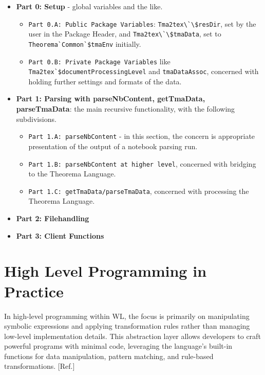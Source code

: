 \begin{itemize}
    \item \textbf{Part 0: Setup} - global variables and the like.
    \begin{itemize}
        \item \texttt{Part 0.A: Public Package Variables}: \lstinline+Tma2tex\`\$resDir+, set by the user in the Package Header, and \lstinline+Tma2tex\`\$tmaData+, set to \lstinline+Theorema`Common`$tmaEnv+ initially.
        \item \texttt{Part 0.B: Private Package Variables} like \lstinline+Tma2tex`$documentProcessingLevel+ and \lstinline+tmaDataAssoc+, concerned with holding further settings and formats of the data.
    \end{itemize}
    
    \item \textbf{Part 1: Parsing with parseNbContent, getTmaData, parseTmaData}: the main recursive functionality, with the following subdivisions.   
    \begin{itemize}
        \item \texttt{Part 1.A: parseNbContent} - in this section, the concern is appropriate presentation of the output of a notebook parsing run. 
        \item \texttt{Part 1.B: parseNbContent at higher level}, concerned with bridging to the Theorema Language.
        \item \texttt{Part 1.C: getTmaData/parseTmaData}, concerned with processing the Theorema Language.
    \end{itemize}
    
    \item \textbf{Part 2: Filehandling}
    \begin{itemize}
        
    \end{itemize}

    \item \textbf{Part 3: Client Functions}
    \begin{itemize}
        
    \end{itemize}
\end{itemize}

\section{High Level Programming in Practice}

In high-level programming within WL, the focus is primarily on manipulating symbolic expressions and applying transformation rules rather than managing low-level implementation details. This abstraction layer allows developers to craft powerful programs with minimal code, leveraging the language's built-in functions for data manipulation, pattern matching, and rule-based transformations. [Ref.]

